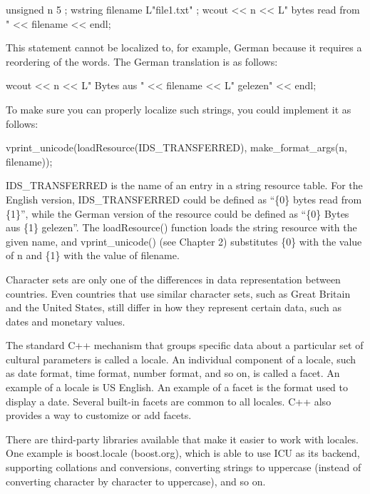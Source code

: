 \begin{cpp}
unsigned n { 5 };
wstring filename { L"file1.txt" };
wcout << n << L" bytes read from " << filename << endl;
\end{cpp}

This statement cannot be localized to, for example, German because it requires a reordering of the words. The German translation is as follows:

\begin{cpp}
wcout << n << L" Bytes aus " << filename << L" gelezen" << endl;
\end{cpp}

To make sure you can properly localize such strings, you could implement it as follows:

\begin{cpp}
vprint_unicode(loadResource(IDS_TRANSFERRED), make_format_args(n, filename));
\end{cpp}

IDS\_TRANSFERRED is the name of an entry in a string resource table. For the English version, IDS\_TRANSFERRED could be defined as “\{0\} bytes read from \{1\}”, while the German version of the resource could be defined as “\{0\} Bytes aus \{1\} gelezen”. The loadResource() function loads the string resource with the given name, and vprint\_unicode() (see Chapter 2) substitutes \{0\} with the value of n and \{1\} with the value of filename.


Character sets are only one of the differences in data representation between countries. Even countries that use similar character sets, such as Great Britain and the United States, still differ in how they represent certain data, such as dates and monetary values.

The standard C++ mechanism that groups specific data about a particular set of cultural parameters is called a locale. An individual component of a locale, such as date format, time format, number format, and so on, is called a facet. An example of a locale is US English. An example of a facet is the format used to display a date. Several built-in facets are common to all locales. C++ also provides a way to customize or add facets.

There are third-party libraries available that make it easier to work with locales. One example is boost.locale (boost.org), which is able to use ICU as its backend, supporting collations and conversions, converting strings to uppercase (instead of converting character by character to uppercase), and so on.

